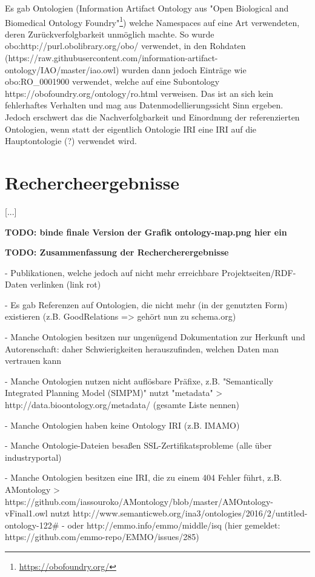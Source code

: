\documentclass{article}
\begin{document}
Es gab Ontologien (Information Artifact Ontology aus "Open Biological and Biomedical Ontology Foundry"\footnote{\url{https://obofoundry.org/}}) welche Namespaces auf eine Art verwendeten, deren Zurückverfolgbarkeit unmöglich machte.
So wurde obo:http://purl.obolibrary.org/obo/ verwendet, in den Rohdaten (https://raw.githubusercontent.com/information-artifact-ontology/IAO/master/iao.owl) wurden dann jedoch Einträge wie obo:RO\_0001900 verwendet, welche auf eine Subontology https://obofoundry.org/ontology/ro.html verweisen.
Das ist an sich kein fehlerhaftes Verhalten und mag aus Datenmodellierungssicht Sinn ergeben.
Jedoch erschwert das die Nachverfolgbarkeit und Einordnung der referenzierten Ontologien, wenn statt der eigentlich Ontologie IRI eine IRI auf die Hauptontologie (?) verwendet wird.

\section{Rechercheergebnisse}

[...]

\textbf{TODO: binde finale Version der Grafik ontology-map.png hier ein}

\textbf{TODO: Zusammenfassung der Rechercherergebnisse}

- Publikationen, welche jedoch auf nicht mehr erreichbare Projektseiten/RDF-Daten verlinken (link rot)

- Es gab Referenzen auf Ontologien, die nicht mehr (in der genutzten Form) existieren (z.B. GoodRelations => gehört nun zu schema.org)

- Manche Ontologien besitzen nur ungenügend Dokumentation zur Herkunft und Autorenschaft: daher Schwierigkeiten herauszufinden, welchen Daten man vertrauen kann

- Manche Ontologien nutzen nicht auflösbare Präfixe, z.B. "Semantically Integrated Planning Model (SIMPM)" nutzt "metadata" > http://data.bioontology.org/metadata/ (gesamte Liste nennen)

- Manche Ontologien haben keine Ontology IRI (z.B. IMAMO)

- Manche Ontologie-Dateien besaßen SSL-Zertifikatsprobleme (alle über industryportal)

- Manche Ontologien besitzen eine IRI, die zu einem 404 Fehler führt, z.B. AMontology > https://github.com/iassouroko/AMontology/blob/master/AMOntology-vFinal1.owl nutzt http://www.semanticweb.org/ina3/ontologies/2016/2/untitled-ontology-122\#
  - oder http://emmo.info/emmo/middle/isq (hier gemeldet: https://github.com/emmo-repo/EMMO/issues/285)
\end{document}

